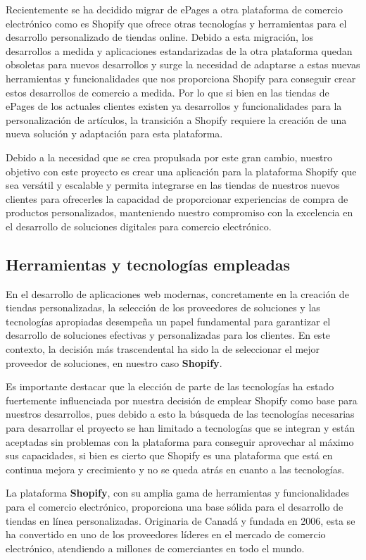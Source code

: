 \documentclass[12pt]{article}
\begin{document}
Recientemente se ha decidido migrar de ePages a otra plataforma de comercio electrónico como es Shopify que ofrece otras tecnologías y herramientas
para el desarrollo personalizado de tiendas online. Debido a esta migración, los desarrollos a medida y aplicaciones estandarizadas de la otra plataforma quedan obsoletas para nuevos desarrollos
y surge la necesidad de adaptarse a estas nuevas herramientas y funcionalidades que nos proporciona Shopify para conseguir crear estos desarrollos de comercio a medida. Por lo que si
bien en las tiendas de ePages de los actuales clientes existen ya desarrollos y funcionalidades para la personalización de artículos, la transición a Shopify requiere la creación de
una nueva solución y adaptación para esta plataforma.

Debido a la necesidad que se crea propulsada por este gran cambio, nuestro objetivo con este proyecto es crear una aplicación para la plataforma Shopify que sea versátil y escalable
y permita integrarse en las tiendas de nuestros nuevos clientes para ofrecerles la capacidad de proporcionar experiencias de compra de productos personalizados,
manteniendo nuestro compromiso con la excelencia en el desarrollo de soluciones digitales para comercio electrónico.

\subsection{Herramientas y tecnologías empleadas}
En el desarrollo de aplicaciones web modernas, concretamente en la creación de tiendas personalizadas, la selección de los proveedores de soluciones
y las tecnologías apropiadas desempeña un papel fundamental para garantizar el desarrollo de soluciones efectivas y personalizadas para los clientes.
En este contexto, la decisión más trascendental ha sido la de seleccionar el mejor proveedor de soluciones, en nuestro caso \textbf{Shopify}.

Es importante destacar que la elección de parte de las tecnologías ha estado fuertemente influenciada por nuestra decisión de emplear Shopify
como base para nuestros desarrollos, pues debido a esto la búsqueda de las tecnologías necesarias para desarrollar el proyecto se han limitado a
tecnologías que se integran y están aceptadas sin problemas con la plataforma para conseguir aprovechar al máximo sus capacidades, si bien es cierto
que Shopify es una plataforma que está en continua mejora y crecimiento y no se queda atrás en cuanto a las tecnologías.

La plataforma \textbf{Shopify}, con su amplia gama de herramientas y funcionalidades para el comercio electrónico, 
proporciona una base sólida para el desarrollo de tiendas en línea personalizadas. Originaria de Canadá y 
fundada en 2006, esta se ha convertido en uno de los proveedores líderes en el mercado de comercio electrónico, 
atendiendo a millones de comerciantes en todo el mundo. 
\end{document}
